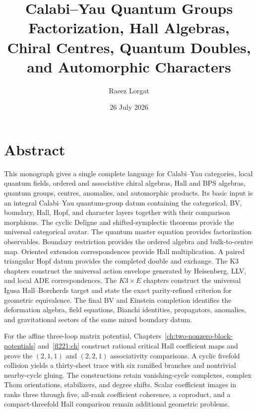 \documentclass[11pt,twoside,openright]{memoir}
\title{\texorpdfstring{\textbf{Calabi--Yau Quantum Groups}\\[0.55em]\Large Factorization, Hall Algebras, Chiral Centres, Quantum Doubles, and Automorphic Characters}{Calabi--Yau Quantum Groups}}
\author{Raeez Lorgat}
\date{26 July 2026}
\begin{document}
\frontmatter
\maketitle
\thispagestyle{empty}
\cleardoublepage
\chapter*{Abstract}

This monograph gives a single complete language for Calabi--Yau categories, local quantum fields, ordered and associative chiral algebras, Hall and BPS algebras, quantum groups, centres, anomalies, and automorphic products.  Its basic input is an integral Calabi--Yau quantum-group datum containing the categorical, BV, boundary, Hall, Hopf, and character layers together with their comparison morphisms.  The cyclic Deligne and shifted-symplectic theorems provide the universal categorical avatar.  The quantum master equation provides factorization observables.  Boundary restriction provides the ordered algebra and bulk-to-centre map.  Oriented extension correspondences provide Hall multiplication.  A paired triangular Hopf datum provides the completed double and exchange.  The K3 chapters construct the universal action envelope generated by Heisenberg, LLV, and local ADE correspondences.  The $K3\times E$ chapters construct the universal Igusa Hall--Borcherds target and state the exact parity-refined criterion for geometric equivalence.  The final BV and Einstein completion identifies the deformation algebra, field equations, Bianchi identities, propagators, anomalies, and gravitational sectors of the same mixed boundary datum.

For the affine three-loop matrix potential, Chapters~\ref{ch:two-nonzero-block-potentials} and~\ref{fl221:ch} construct rational critical Hall coefficient maps and prove the $(2,1,1)$ and $(2,2,1)$ associativity comparisons. A cyclic fivefold collision yields a thirty-sheet trace with six ramified branches and nontrivial nearby-cycle gluing. The constructions retain vanishing-cycle complexes, complex Thom orientations, stabilizers, and degree shifts. Scalar coefficient images in ranks three through five, all-rank coefficient coherence, a coproduct, and a compact-threefold Hall comparison remain additional geometric problems.
\end{document}
